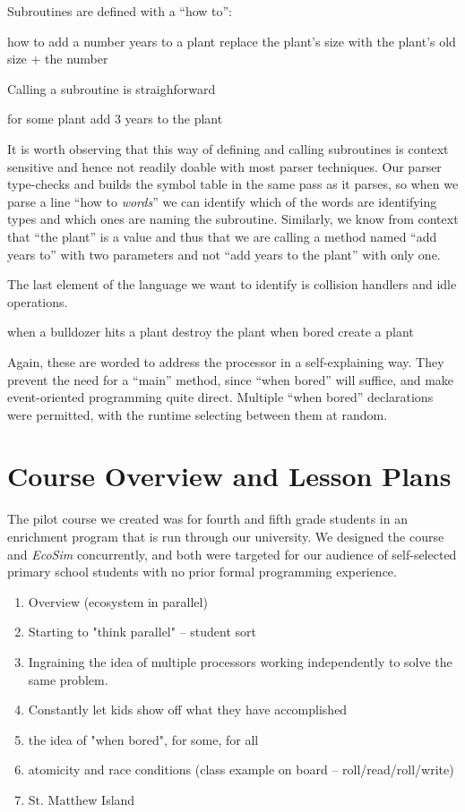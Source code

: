 \documentclass{sig-alternate}
\newcommand{\INDSTATE}[1][1]{\STATE\hspace{#1\algorithmicindent}}
\newenvironment{snippet}{\begin{algorithmic}[1]}{\end{algorithmic}}
\begin{document}
Subroutines are defined with a ``how to'':
\begin{snippet}
\STATE how to add a number years to a plant
\INDSTATE replace the plant's size with the plant's old size + the number
\end{snippet}
Calling a subroutine is straighforward
\begin{snippet}
\STATE for some plant
\INDSTATE add 3 years to the plant
\end{snippet}
It is worth observing that this way of defining and calling subroutines
is context sensitive and hence not readily doable with most parser techniques.
Our parser type-checks and builds the symbol table in the same pass as it parses,
so when we parse a line ``how to \emph{words}''
we can identify which of the words are identifying types
and which ones are naming the subroutine.
Similarly, we know from context that ``the plant'' is a value
and thus that we are calling a method named ``add years to'' with two parameters
and not ``add years to the plant'' with only one.

The last element of the language we want to identify
is collision handlers and idle operations.
\begin{snippet}
\STATE when a bulldozer hits a plant
\INDSTATE destroy the plant
\STATE when bored
\INDSTATE create a plant
\end{snippet}
Again, these are worded to address the processor in a self-explaining way.
They prevent the need for a ``main'' method, since ``when bored'' will suffice,
and make event-oriented programming quite direct.
Multiple ``when bored'' declarations were permitted,
with the runtime selecting between them at random.


\section{Course Overview and Lesson Plans}
The pilot course we created was for fourth and fifth grade students in an enrichment program
that is run through our university.  We designed the course and \emph{EcoSim} concurrently,
and both were targeted for our audience of self-selected primary school students with no
prior formal programming experience.
\begin{enumerate}
\item Overview (ecosystem in parallel)
\item Starting to "think parallel" -- student sort
\item Ingraining the idea of multiple processors working independently to solve the same problem.
\item Constantly let kids show off what they have accomplished
\item the idea of "when bored", for some, for all
\item atomicity and race conditions (class example on board -- roll/read/roll/write)
\item St. Matthew Island
\end{enumerate}
\end{document}

